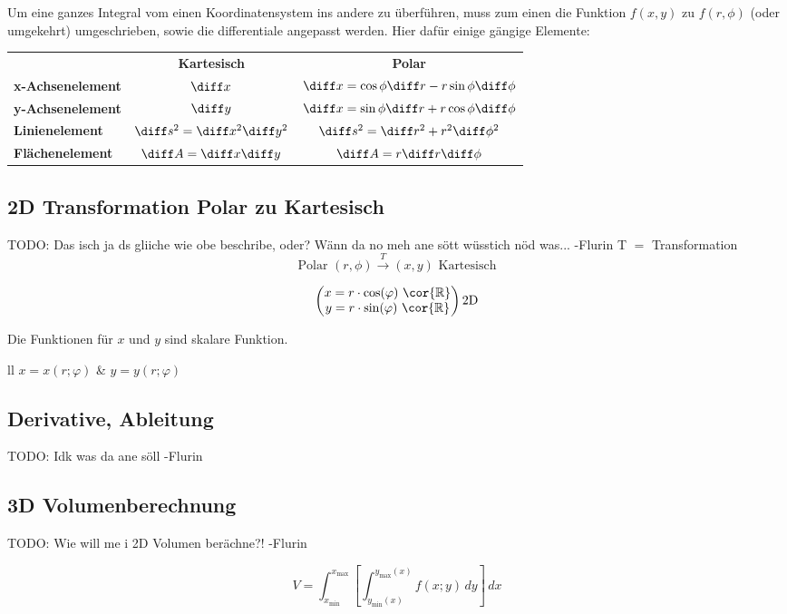 Um eine ganzes Integral vom einen Koordinatensystem ins andere zu überführen, muss zum einen die Funktion $ f(x, y) $ zu $ f(r, \phi) $ (oder umgekehrt) umgeschrieben, sowie die differentiale angepasst werden.
Hier dafür einige gängige Elemente:

\begin{tabular}{l c c}
                         & \bf{Kartesisch}                   & \bf{Polar}                                                     \\
    \bf{x-Achsenelement} & $\diff x$                         & $\diff x = \cos \phi \diff r - r \sin \phi \diff \phi$    \\
    \bf{y-Achsenelement} & $\diff y$                         & $\diff x = \sin \phi \diff r + r \cos \phi \diff \phi$    \\
    \bf{Linienelement  } & $\diff s^2 = \diff x^2 \diff y^2$ & $\diff s^2 = \diff r^2 + r^2 \diff \phi^2$                \\
    \bf{Flächenelement } & $\diff A = \diff x \diff y$       & $\diff A = r \diff r \diff \phi$                          \\
\end{tabular}

\subsection{2D Transformation Polar zu Kartesisch}
TODO: Das isch ja ds gliiche wie obe beschribe, oder?
      Wänn da no meh ane sött wüsstich nöd was... -Flurin
T $=$ Transformation
\[
    \text{Polar } (r,\phi) \xrightarrow{T} (x,y) \text{ Kartesisch}
\]

\[
\begin{pmatrix}
    x=r\cdot\cos(\varphi) \text{ } \cor{\mathbb{R}} \\
    y=r\cdot\sin(\varphi) \text{ } \cor{\mathbb{R}} 
\end{pmatrix}
\text{2D}
\]

Die Funktionen für $x$ und $y$ sind skalare Funktion.

    \begin{ctabular}{ll}
        $x=x(r;\varphi)$ & $ y=y(r;\varphi)$
    \end{ctabular}

\subsection{Derivative, Ableitung}
TODO: Idk was da ane söll -Flurin

\subsection{3D Volumenberechnung}
TODO: Wie will me i 2D Volumen berächne?! -Flurin

$$V=\int_{x_{\min}}^{x_{\max}} \left[\int_{y_{\min}(x)}^{y_{\max}(x)} f\left(x;y\right)  \,dy \right] \,dx $$

